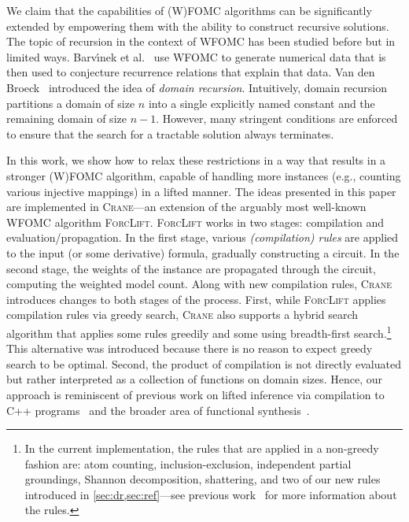 \documentclass{article}
\theoremstyle{definition}
\theoremstyle{remark}
\begin{document}
We claim that the capabilities of (W)FOMC algorithms can be significantly
extended by empowering them with the ability to construct recursive solutions.
The topic of recursion in the context of WFOMC has been studied before but in
limited ways. Barv{\'{\i}}nek et al.~
use WFOMC to generate numerical data that is then used to conjecture recurrence
relations that explain that data. Van den
Broeck~ introduced the idea of \emph{domain
  recursion}. Intuitively, domain recursion partitions a domain of size $n$ into
a single explicitly named constant and the remaining domain of size $n-1$.
However, many stringent conditions are enforced to ensure that the search for a
tractable solution always terminates.



In this work, we show how to relax these restrictions in a way that results in a
stronger (W)FOMC algorithm, capable of handling more instances (e.g., counting
various injective mappings) in a lifted manner. The ideas presented in this
paper are implemented in \textsc{Crane}---an extension of the arguably most
well-known WFOMC algorithm \textsc{ForcLift}. \textsc{ForcLift} works in two
stages: compilation and evaluation/propagation. In the first stage, various
\emph{(compilation) rules} are applied to the input (or some derivative)
formula, gradually constructing a circuit. In the second stage, the weights of
the instance are propagated through the circuit, computing the weighted model
count. Along with new compilation rules, \textsc{Crane} introduces changes to
both stages of the process. First, while \textsc{ForcLift} applies compilation
rules via greedy search, \textsc{Crane} also supports a hybrid search algorithm
that applies some rules greedily and some using breadth-first
search.\footnote{In the current implementation, the rules that are applied in a
  non-greedy fashion are: atom counting, inclusion-exclusion, independent
  partial groundings, Shannon decomposition, shattering, and two of our new
  rules introduced in \cref{sec:dr,sec:ref}---see previous
  work~\cite{DBLP:conf/ijcai/BroeckTMDR11} for more information about the
  rules.} This alternative was introduced because there is no reason to expect
greedy search to be optimal. Second, the product of compilation is not directly
evaluated but rather interpreted as a collection of functions on domain sizes.
Hence, our approach is reminiscent of previous work on lifted inference via
compilation to C++ programs~\cite{DBLP:conf/kr/KazemiP16} and the broader area
of functional
synthesis~\cite{DBLP:conf/cav/GoliaRM20,DBLP:conf/pldi/KuncakMPS10,sanathanan1963transfer}.
\end{document}
